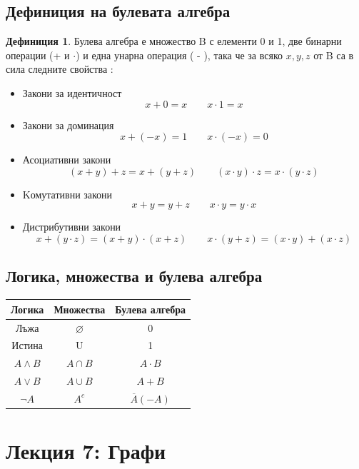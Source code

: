 \documentclass[fleqn, 12pt]{article}
\theoremstyle{definition}
\newtheorem{definition}{Дефиниция}[subsection]
\begin{document}
\subsection{Дефиниция на булевата алгебра}
\begin{definition}
Булева алгебра е множество B с елементи 0 и 1, две бинарни операции (+ и $\cdot$) и една унарна операция ( - ), така че за всяко $x, y, z$ от B са в сила следните свойства :
\begin{itemize}
\item Закони за идентичност
$$x + 0 = x \qquad x \cdot 1 = x$$
\item Закони за доминация
$$ x+(-x) = 1 \qquad x \cdot (-x) = 0$$
\item Асоциативни закони
$$(x+y)+z  = x +(y+z) \qquad (x \cdot y) \cdot z = x \cdot ( y \cdot z) $$
\item Kомутативни закони
$$x+y = y+z \qquad x \cdot y = y \cdot x$$
\item Дистрибутивни закони
$$x+(y \cdot z) = (x+y) \cdot (x+z) \qquad  x\cdot(y + z) = (x\cdot y) + (x\cdot z)$$
\end{itemize}
\end{definition}

\subsection{Логика, множества и булева алгебра}
\begin{table}[h!]
  \begin{center}
    \begin{tabular}{|c|c|c|} 
\hline
      \textbf{Логика} &  \textbf{Множества} &  \textbf{Булева алгебра}\\
\hline
	Лъжа & $\varnothing$ & 0\\ 
\hline
	Истина & U & 1\\
\hline
	$A \land B$ & $A \cap B$ & $A \cdot B$ \\ 
\hline
	$A \lor B$ & $A \cup B$ & $A + B$\\
\hline
	$\neg A$ & $A^c$ & $\overline{A} (-A)$ \\  
\hline
    \end{tabular}
  \end{center}
\end{table}

\newpage

\section{Лекция 7: Графи}
\end{document}
